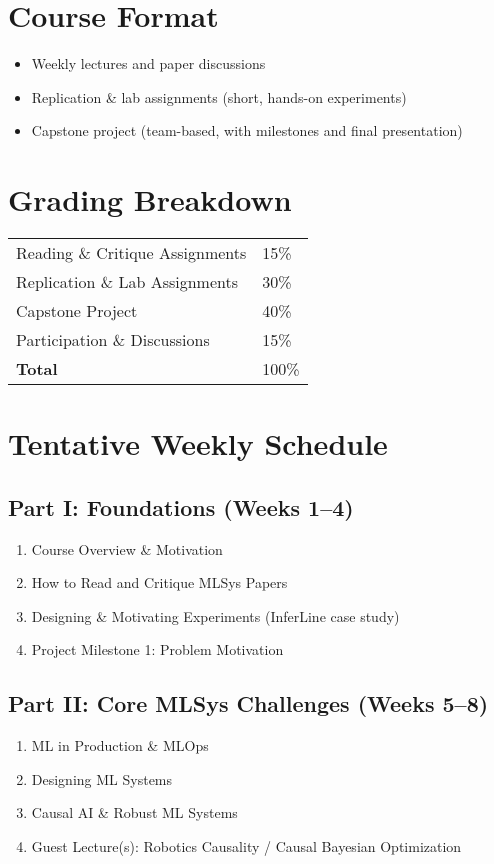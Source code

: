 \documentclass[11pt]{article}
\begin{document}
\section*{Course Format}
\begin{itemize}[leftmargin=*]
    \item Weekly lectures and paper discussions
    \item Replication \& lab assignments (short, hands-on experiments)
    \item Capstone project (team-based, with milestones and final presentation)
\end{itemize}

\section*{Grading Breakdown}
\begin{tabular}{ll}
Reading \& Critique Assignments & 15\% \\
Replication \& Lab Assignments  & 30\% \\
Capstone Project                & 40\% \\
Participation \& Discussions    & 15\% \\
\textbf{Total}                  & 100\% \\
\end{tabular}

\section*{Tentative Weekly Schedule}

\subsection*{Part I: Foundations (Weeks 1–4)}
\begin{enumerate}[leftmargin=*]
    \item Course Overview \& Motivation  
    \item How to Read and Critique MLSys Papers  
    \item Designing \& Motivating Experiments (InferLine case study)  
    \item Project Milestone 1: Problem Motivation  
\end{enumerate}

\subsection*{Part II: Core MLSys Challenges (Weeks 5–8)}
\begin{enumerate}[resume, leftmargin=*]
    \item ML in Production \& MLOps  
    \item Designing ML Systems  
    \item Causal AI \& Robust ML Systems  
    \item Guest Lecture(s): Robotics Causality / Causal Bayesian Optimization  
\end{enumerate}
\end{document}
